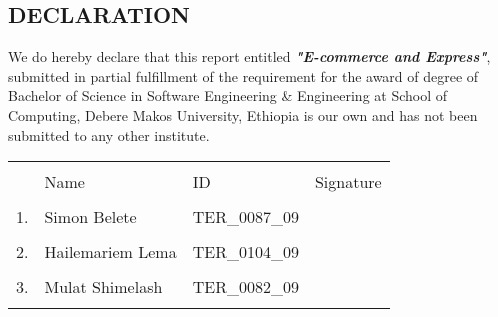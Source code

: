 \begin{normalsize}

\begin{center}
\section*{DECLARATION}
\end{center}


\doublespacing
\vspace{1.0cm}
\noindent
We do hereby declare that this report entitled \textbf{\textit{"E-commerce and Express"}}, submitted in partial fulfillment of the requirement for the award of degree of Bachelor of Science in Software Engineering \& Engineering at School of Computing, Debere Makos University, Ethiopia is our own and has not been submitted to any other institute.

\begin{tabular}{p{.2in}p{1.4in}p{1.7in}p{1.5in} }
\\
\\
 & Name &  ID & Signature \\
 \\
 1. & Simon Belete & TER\_0087\_09 & \hrulefill \\
 \\
 2. & Hailemariem Lema & TER\_0104\_09 & \hrulefill \\
 \\
 3. & Mulat Shimelash & TER\_0082\_09 & \hrulefill \\
 \\	
\end{tabular}

\end{normalsize}